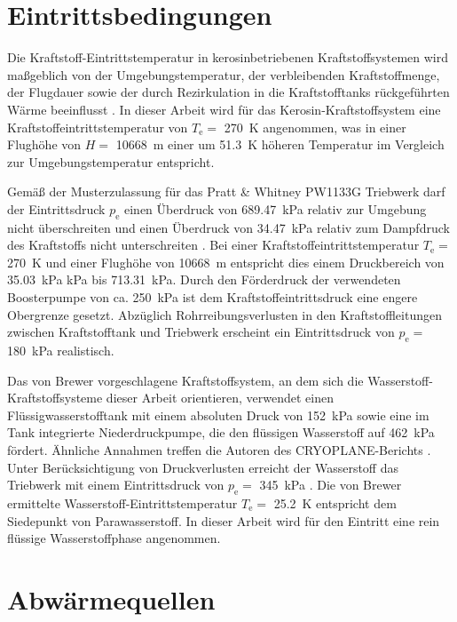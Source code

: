 \section{Eintrittsbedingungen}

Die Kraftstoff-Eintrittstemperatur in kerosinbetriebenen Kraftstoffsystemen wird maßgeblich von der Umgebungstemperatur, der verbleibenden Kraftstoffmenge, der Flugdauer sowie der durch Rezirkulation in die Kraftstofftanks rückgeführten Wärme beeinflusst \cite{German.2012}. In dieser Arbeit wird für das Kerosin-Kraftstoffsystem eine Kraftstoffeintrittstemperatur von $T_\mathrm{e}=$ \SI{270}{\K} angenommen, was in einer Flughöhe von $H= $ \SI{10668}{\m} einer um \SI{51.3}{\K} höheren Temperatur im Vergleich zur Umgebungstemperatur entspricht. 

Gemäß der Musterzulassung für das Pratt \& Whitney PW1133G Triebwerk darf der Eintrittsdruck $p_\mathrm{e}$ einen Überdruck von \SI{689.47}{\kilo\Pa} relativ zur Umgebung nicht überschreiten und einen Überdruck von \SI{34.47}{\kilo\Pa} relativ zum Dampfdruck des Kraftstoffs nicht unterschreiten \cite{EASA.2018}. Bei einer Kraftstoffeintrittstemperatur $T_\mathrm{e}=$ \SI{270}{\K} und einer Flughöhe von \SI{10668}{\m} entspricht dies einem Druckbereich von \SI{35.03}{\kilo\Pa} kPa bis \SI{713.31}{\kilo\Pa}. Durch den Förderdruck der verwendeten Boosterpumpe von ca. \SI{250}{\kilo\Pa} \cite{EatonFuelSystemsDivision.2013} ist dem Kraftstoffeintrittsdruck eine engere Obergrenze gesetzt. Abzüglich Rohrreibungsverlusten in den Kraftstoffleitungen zwischen Kraftstofftank und Triebwerk erscheint ein Eintrittsdruck von $p_\mathrm{e}=$ \SI{180}{\kilo\Pa} realistisch.

Das von Brewer \cite{Brewer.1991} vorgeschlagene Kraftstoffsystem, an dem sich die Wasserstoff-Kraftstoffsysteme dieser Arbeit orientieren, verwendet einen Flüssigwasserstofftank mit einem absoluten Druck von \SI{152}{\kilo\Pa} sowie eine im Tank integrierte Niederdruckpumpe, die den flüssigen Wasserstoff auf \SI{462}{\kilo\Pa} fördert. Ähnliche Annahmen treffen die Autoren des CRYOPLANE-Berichts \cite{Scholz.2003}. Unter Berücksichtigung von Druckverlusten erreicht der Wasserstoff das Triebwerk mit einem Eintrittsdruck von $p_\mathrm{e}=$ \SI{345}{\kilo\Pa} \cite{Brewer.1991}. Die von Brewer ermittelte Wasserstoff-Eintrittstemperatur $T_\mathrm{e}=$ \SI{25.2}{\K} entspricht dem Siedepunkt von Parawasserstoff. In dieser Arbeit wird für den Eintritt eine rein flüssige Wasserstoffphase angenommen.

\section{Abwärmequellen}

